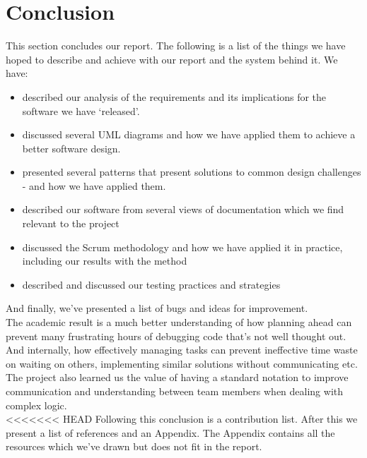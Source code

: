 \section{Conclusion}
This section concludes our report. The following is a list of the things we have hoped to describe and achieve with our report and the system behind it. We have:
\begin{itemize}
\item described our analysis of the requirements and its implications for the software we have `released'. 
\item discussed several UML diagrams and how we have applied them to achieve a better software design. 
\item presented several patterns that present solutions to common design challenges - and how we have applied them. 
\item described our software from several views of documentation which we find relevant to the project
\item discussed the Scrum methodology and how we have applied it in practice, including our results with the method
\item described and discussed our testing practices and strategies
\end{itemize}
And finally, we've presented a list of bugs and ideas for improvement.\\
The academic result is a much better understanding of how planning ahead can prevent many frustrating hours of debugging code that's not well thought out. And internally, how effectively managing tasks can prevent ineffective time waste on waiting on others, implementing similar solutions without communicating etc. The project also learned us the value of having a standard notation to improve communication and understanding between team members when dealing with complex logic.\\
<<<<<<< HEAD
Following this conclusion is a contribution list. After this we present a list of references and an Appendix. The Appendix contains all the resources which we've drawn but does not fit in the report.\\
\newpage